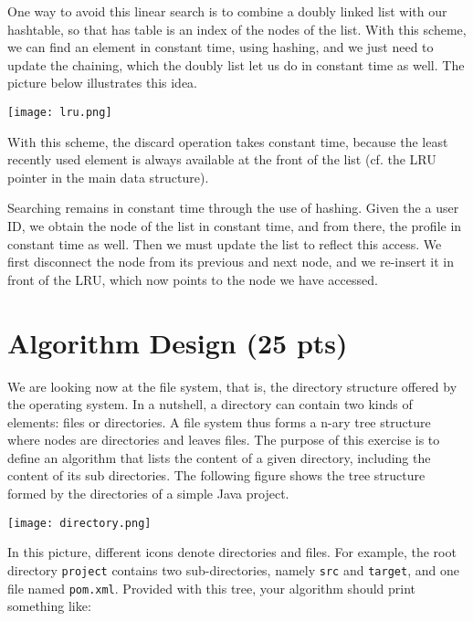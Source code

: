 \documentclass[11pt]{article}
\begin{document}
One way to avoid this linear search is to combine a doubly linked
list with our hashtable, so that has table is an index of the nodes
of the list. With this scheme, we can find an element in constant
time, using hashing, and we just need to update the chaining, which
the doubly list let us do in constant time as well. The picture
below illustrates this idea.

\begin{center}
\texttt{[image: lru.png]}
\end{center}

With this scheme, the discard operation takes constant time, because
the least recently used element is always available at the front of
the list (cf. the LRU pointer in the main data structure).

Searching remains in constant time through the use of
hashing. Given the a user ID, we obtain the node of the list in
constant time, and from there, the profile in constant time as
well. Then we must update the list to reflect this access. We first
disconnect the node from its previous and next node, and we
re-insert it in front of the LRU, which now points to the node we
have accessed.

\section{Algorithm Design (25 pts)}
\label{sec:org4a71011}

We are looking now at the file system, that is, the directory
structure offered by the operating system. In a nutshell, a
directory can contain two kinds of elements: files or directories. A
file system thus forms a n-ary tree structure where nodes are
directories and leaves files. The purpose of this exercise is to
define an algorithm that lists the content of a given directory,
including the content of its sub directories. The following figure
shows the tree structure formed by the directories of a simple Java
project.

\begin{center}
\texttt{[image: directory.png]}
\end{center}

In this picture, different icons denote directories and files. For
example, the root directory \texttt{project} contains two sub-directories,
namely \texttt{src} and \texttt{target}, and one file named \texttt{pom.xml}. Provided
with this tree, your algorithm should print something like:
\end{document}
